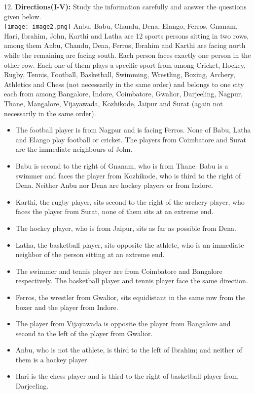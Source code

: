 \documentclass[
]{article}
\begin{document}
12. \textbf{Directions(I-V):} Study the information carefully and answer the questions given below.\\
\texttt{[image: image2.png]}
Anbu, Babu, Chandu, Dena, Elango, Ferros, Gnanam, Hari, Ibrahim, John, Karthi and Latha
are 12 sports persons sitting in two rows, among them Anbu, Chandu, Dena, Ferros,
Ibrahim and Karthi are facing north while the remaining are facing south. Each person faces
exactly one person in the other row. Each one of them plays a specific sport from among
Cricket, Hockey, Rugby, Tennis, Football, Basketball, Swimming, Wrestling, Boxing,
Archery, Athletics and Chess (not necessarily in the same order) and belongs to one city
each from among Bangalore, Indore, Coimbatore, Gwalior, Darjeeling, Nagpur, Thane,
Mangalore, Vijayawada, Kozhikode, Jaipur and Surat (again not necessarily in the same
order).\\
\begin{itemize}
\item The football player is from Nagpur and is facing Ferros. None of Babu, Latha and
Elango play football or cricket. The players from Coimbatore and Surat are the
immediate neighbours of John.
\item Babu is second to the right of Gnanam, who is from Thane. Babu is a swimmer and
faces the player from Kozhikode, who is third to the right of Dena. Neither Anbu nor
Dena are hockey players or from Indore.
\item Karthi, the rugby player, sits second to the right of the archery player, who faces the
player from Surat, none of them sits at an extreme end.
\item The hockey player, who is from Jaipur, sits as far as possible from Dena.
\item Latha, the basketball player, sits opposite the athlete, who is an immediate neighbor
of the person sitting at an extreme end.
\item The swimmer and tennis player are from Coimbatore and Bangalore respectively.
The basketball player and tennis player face the same direction.
\item Ferros, the wrestler from Gwalior, sits equidistant in the same row from the boxer
and the player from Indore.
\item The player from Vijayawada is opposite the player from Bangalore and second to the
left of the player from Gwalior.
\item Anbu, who is not the athlete, is third to the left of Ibrahim; and neither of them is a
hockey player.
\item Hari is the chess player and is third to the right of basketball player from Darjeeling.
\end{itemize}
\end{document}
